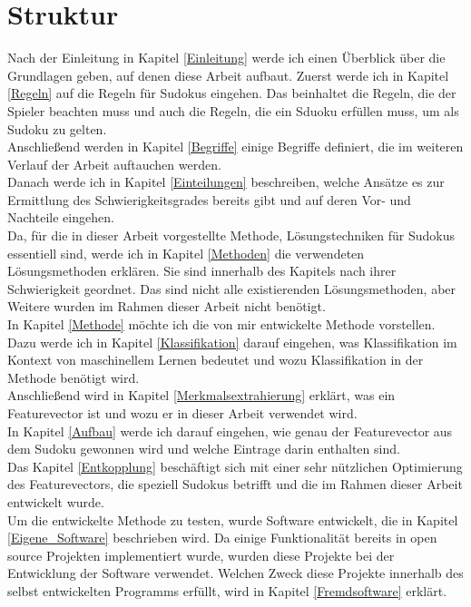 \section{Struktur}
Nach der Einleitung in Kapitel \ref{Einleitung} werde ich einen Überblick über die Grundlagen geben, auf denen diese Arbeit aufbaut. Zuerst werde ich in Kapitel \ref{Regeln} auf die Regeln für Sudokus eingehen. Das beinhaltet die Regeln, die der Spieler beachten muss und auch die Regeln, die ein Sduoku erfüllen muss, um als Sudoku zu gelten. \\
Anschließend werden in Kapitel \ref{Begriffe} einige Begriffe definiert, die im weiteren Verlauf der Arbeit auftauchen werden.\\
Danach werde ich in Kapitel \ref{Einteilungen} beschreiben, welche Ansätze es zur Ermittlung des Schwierigkeitsgrades bereits gibt und auf deren Vor- und Nachteile eingehen.\\
Da, für die in dieser Arbeit vorgestellte Methode, Lösungstechniken für Sudokus essentiell sind, werde ich in Kapitel \ref{Methoden} die verwendeten Lösungsmethoden erklären. Sie sind innerhalb des Kapitels nach ihrer Schwierigkeit geordnet. Das sind nicht alle existierenden Lösungsmethoden, aber Weitere wurden im Rahmen dieser Arbeit nicht benötigt.\\
In Kapitel \ref{Methode} möchte ich die von mir entwickelte Methode vorstellen. Dazu werde ich in Kapitel \ref{Klassifikation} darauf eingehen, was Klassifikation im Kontext von maschinellem Lernen bedeutet und wozu Klassifikation in der Methode benötigt wird.\\
Anschließend wird in Kapitel \ref{Merkmalsextrahierung} erklärt, was ein Featurevector ist und wozu er in dieser Arbeit verwendet wird.\\
In Kapitel \ref{Aufbau} werde ich darauf eingehen, wie genau der Featurevector aus dem Sudoku gewonnen wird und welche Eintrage darin enthalten sind.\\
Das Kapitel \ref{Entkopplung} beschäftigt sich mit einer sehr nützlichen Optimierung des Featurevectors, die speziell Sudokus betrifft und die im Rahmen dieser Arbeit entwickelt wurde.\\
Um die entwickelte Methode zu testen, wurde Software entwickelt, die in Kapitel \ref{Eigene_Software} beschrieben wird. Da einige Funktionalität bereits in open source Projekten implementiert wurde, wurden diese Projekte bei der Entwicklung der Software verwendet. Welchen Zweck diese Projekte innerhalb des selbst entwickelten Programms erfüllt, wird in Kapitel \ref{Fremdsoftware} erklärt.\\

